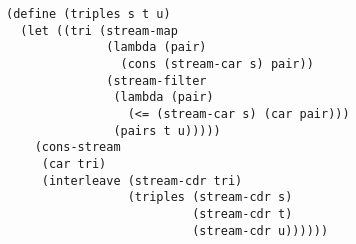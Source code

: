 \documentclass[a4paper,12pt]{article}
\begin{document}
\begin{lstlisting}
(define (triples s t u)
  (let ((tri (stream-map
              (lambda (pair)
                (cons (stream-car s) pair))
              (stream-filter
               (lambda (pair)
                 (<= (stream-car s) (car pair)))
               (pairs t u)))))
    (cons-stream
     (car tri)
     (interleave (stream-cdr tri)
                 (triples (stream-cdr s)
                          (stream-cdr t)
                          (stream-cdr u))))))
\end{lstlisting}
\end{document}

